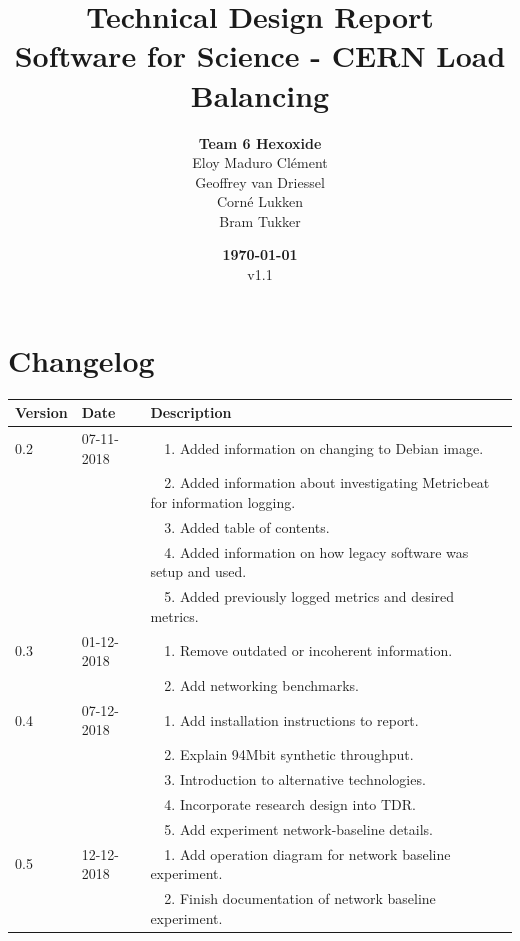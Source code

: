\documentclass[]{article}
\title{Technical Design Report \\
	\large Software for Science - CERN Load Balancing}
\author{\textbf{Team 6 Hexoxide} \\
	Eloy Maduro Clément \\
	Geoffrey van Driessel \\
	Corné Lukken \\
	Bram Tukker}
\date{\textbf{\today} \\
	v1.1}
\newcommand{\tabitemNum}{~~}
\begin{document}
\maketitle
{} %
\newpage

\section*{Changelog}
\begin{table}[H]
	\begin{center}	
		\begin{tabularx}{\textwidth}{ | l | l | X | }
			\hline
			\textbf{Version} & \textbf{Date} & \textbf{Description} \\ \hline
			
			\multirow{1}{*}{0.2} & 07-11-2018 & \tabitemNum 1. Added information on changing to Debian image. \\
			& & \tabitemNum 2. Added information about investigating Metricbeat for information logging. \\
			& & \tabitemNum 3. Added table of contents. \\
			& & \tabitemNum 4. Added information on how legacy software was setup and used. \\
			& & \tabitemNum 5. Added previously logged metrics and desired metrics. \\ \hline
			
			\multirow{1}{*}{0.3} & 01-12-2018 & \tabitemNum 1. Remove outdated or incoherent information. \\
			& & \tabitemNum 2. Add networking benchmarks. \\ \hline
			
			\multirow{1}{*}{0.4} & 07-12-2018 & \tabitemNum 1. Add installation instructions to report. \\
			& & \tabitemNum 2. Explain 94Mbit synthetic throughput. \\
			& & \tabitemNum 3. Introduction to alternative technologies. \\
			& & \tabitemNum 4. Incorporate research design into TDR. \\
			& & \tabitemNum 5. Add experiment network-baseline details. \\ \hline
			
			\multirow{1}{*}{0.5} & 12-12-2018 & \tabitemNum 1. Add operation diagram for network baseline experiment. \\
			& & \tabitemNum 2. Finish documentation of network baseline experiment. \\ \hline
			

\end{tabularx}
\end{center}
\end{table}
\end{document}
